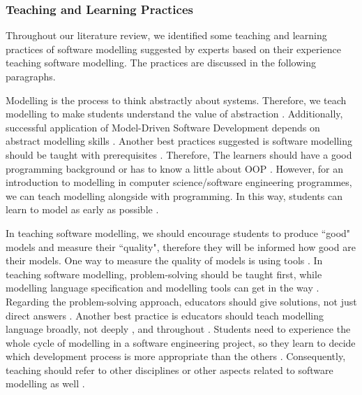 \documentclass[12pt, a4paper]{report}
\begin{document}
{\subsubsection{Teaching and Learning Practices}
Throughout our literature review, we identified some teaching and learning practices of software modelling suggested by experts based on their experience teaching software modelling. The practices are discussed in the following paragraphs.

Modelling is the process to think abstractly about systems. Therefore, we teach modelling to make students understand the value of abstraction \cite{bezivin2009teaching}. Additionally, successful application of Model-Driven Software Development depends on abstract modelling skills \cite{whittle2013industrial}. Another best practices suggested is software modelling should be taught with prerequisites \cite{paige2014bad}. Therefore, The learners should have a good programming background \cite{bezivin2009teaching} or has to know a little about OOP \cite{Akayama2013}. However, for an introduction to modelling in computer science/software engineering programmes, we can teach modelling alongside with programming\cite{borstler2012teaching, bezivin2009teaching}. In this way, students can learn to model as early as possible \cite{Akayama2013, borstler2012teaching}. 

In teaching software modelling, we should encourage students to produce ``good" models and measure their ``quality", therefore they will be informed how good are their models. One way to measure the quality of models is using tools \cite{Akayama2013}. In teaching software modelling, problem-solving should be taught first, while modelling language specification and modelling tools can get in the way \cite{paige2014bad}. Regarding the problem-solving approach, educators should give solutions, not just direct answers \cite{paige2014bad}. Another best practice is educators should teach modelling language broadly, not deeply \cite{paige2014bad}, and throughout \cite{borstler2012teaching}. Students need to experience the whole cycle of modelling in a software engineering project, so they learn to decide which development process is more appropriate than the others \cite{Akayama2013}. Consequently, teaching should refer to other disciplines or other aspects related to software modelling as well \cite{paige2014bad}.

}
\end{document}
